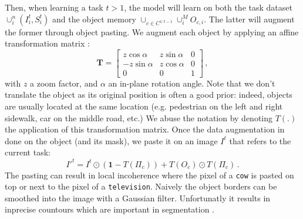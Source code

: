 Then, when learning a task $t > 1$, the model will learn on both the task dataset $\cup_i^n (I^t_i,
    S^t_i)$ and the object memory $\cup_{c \in C^{1:t-1}} \cup_i^M O_{c,i}$. The latter will augment the
former through object pasting. We augment each object by applying an affine transformation matrix
\citep{fang2019instaboost}:
%
\begin{equation}
    \mathbf{T}=\left[\begin{array}{ccc}
            z \cos \alpha  & z \sin \alpha & 0 \\
            -z \sin \alpha & z \cos \alpha & 0 \\
            0              & 0             & 1
        \end{array}\right]\,,
    \label{eq:transformation_matrix_complex}
\end{equation}
%
\noindent with $z$ a zoom factor, and $\alpha$ an in-plane rotation angle. Note that we don't
translate the object as its original position is often a good prior: indeed, objects are usually
located at the same location (e.g. pedestrian on the left and right sidewalk, car on the middle
road, etc.) We abuse the notation by denoting $T(.)$ the application of this transformation matrix.
Once the data augmentation in done on the object (and its mask), we paste it on an image $I^t$ that
refers to the current task:
%
\begin{equation}
    {I'}^t = I^t \odot (\mathbf{1} - T(\Pi_c)) + T(O_c) \odot T(\Pi_c)\,.
    \label{eq:pasting}
\end{equation}
%
The pasting can result in local incoherence where the pixel of a \texttt{cow} is pasted on top or
next to the pixel of a \texttt{television}. Naively the object borders can be smoothed into the
image with a Gaussian filter. Unfortunatly it results in inprecise countours which are important in
segmentation \citep{chen2020semeda}.

